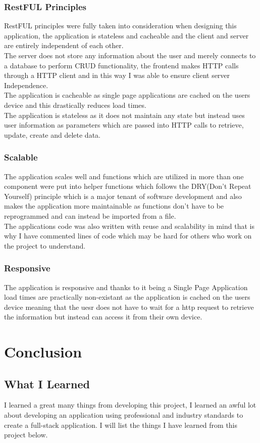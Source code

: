 \subsection{RestFUL Principles}
RestFUL principles were fully taken into consideration when designing this application,
the application is stateless and cacheable and the client and server are entirely independent of each other.
\\
 The server does not store any information
about the user and merely connects to a database to perform CRUD functionality, the
frontend makes HTTP calls through a HTTP client and in this way I was able to ensure
client server Independence.
\\
The application is cacheable as single page applications are cached on the users
device and this drastically reduces load times.
\\
The application is stateless as it does not maintain any state but instead uses
user information as parameters which are passed into HTTP calls to retrieve, update,
create and delete data.
\subsection{Scalable}
The application scales well and functions which are utilized in more than one component
were put into helper functions which follows the DRY(Don't Repeat Yourself) principle
which is a major tenant of software development and also makes the application more
maintainable as functions don't have to be reprogrammed and can instead be imported from
a file.
\\
The applications code was also written with reuse and scalability in mind that is why
I have commented lines of code which may be hard for others who work on the project to
understand.
\subsection{Responsive}
The application is responsive and thanks to it being a Single Page Application load times are
practically non-existant as the application is cached on the users device meaning that the
uesr does not have to wait for a http request to retrieve the information but instead can access
it from their own device.
\chapter{Conclusion}
\section{What I Learned}
I learned a great many things from developing this project, I learned an awful lot about developing an application using professional and industry standards to create a full-stack application.  I will list the things I have learned from this project below.
